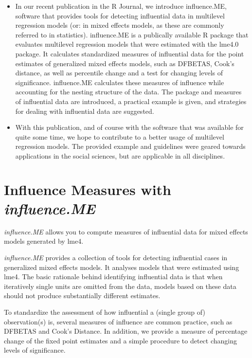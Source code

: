 \documentclass[12pt, a4paper]{report}
\begin{document}
\begin{itemize}
	\item In our recent publication in the R Journal, we introduce influence.ME, software that provides tools for detecting influential data in multilevel regression models (or: in mixed effects models, as these are commonly referred to in statistics). influence.ME is a publically available R package that evaluates multilevel regression models that were estimated with the lme4.0 package. It calculates standardized measures of influential data for the point estimates of generalized mixed effects models, such as DFBETAS, Cook’s distance, as well as percentile change and a test for changing levels of significance. influence.ME calculates these measures of influence while accounting for the nesting structure of the data. The package and measures of influential data are introduced, a practical example is given, and strategies for dealing with influential data are suggested.
	
	\item With this publication, and of course with the software that was available for quite some time, we hope to contribute to a better usage of multilevel regression models. The provided example and guidelines were geared towards applications in the social sciences, but are applicable in all disciplines.
\end{itemize}

\section{Influence Measures with \textit{influence.ME}}
	
	\textit{influence.ME} allows you to compute measures of influential data for mixed effects models generated by lme4.
	
	\textit{influence.ME} provides a collection of tools for detecting influential cases in generalized mixed effects models. It analyses models that were estimated using lme4. The basic rationale behind identifying influential data is that when iteratively single units are omitted from the data, models based on these data should not produce substantially different estimates. 
	
	To standardize the assessment of how influential a (single group of) observation(s) is, several measures of influence are common practice, such as DFBETAS and Cook's Distance. In addition, we provide a measure of percentage change of the fixed point estimates and a simple procedure to detect changing levels of significance.
	
\end{document}
